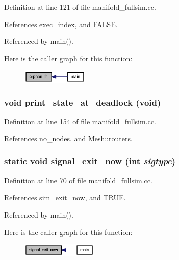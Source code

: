 Definition at line 121 of file manifold\_\-fullsim.cc.

References exec\_\-index, and FALSE.

Referenced by main().

Here is the caller graph for this function:\nopagebreak
\begin{figure}[H]
\begin{center}
\leavevmode
\includegraphics[width=89pt]{manifold__fullsim_8cc_83995bc1d7a29f4a3f671918e86f8eaa_icgraph}
\end{center}
\end{figure}
\subsubsection[{print\_\-state\_\-at\_\-deadlock}]{\setlength{\rightskip}{0pt plus 5cm}void print\_\-state\_\-at\_\-deadlock (void)}\label{manifold__fullsim_8cc_dd8eeaa0833d2f96796f0ee0f0e98f5c}




Definition at line 154 of file manifold\_\-fullsim.cc.

References no\_\-nodes, and Mesh::routers.
\subsubsection[{signal\_\-exit\_\-now}]{\setlength{\rightskip}{0pt plus 5cm}static void signal\_\-exit\_\-now (int {\em sigtype})\hspace{0.3cm}{\tt  [static]}}\label{manifold__fullsim_8cc_eb90a8280771250c1a9ee1d7518cbf63}




Definition at line 70 of file manifold\_\-fullsim.cc.

References sim\_\-exit\_\-now, and TRUE.

Referenced by main().

Here is the caller graph for this function:\nopagebreak
\begin{figure}[H]
\begin{center}
\leavevmode
\includegraphics[width=102pt]{manifold__fullsim_8cc_eb90a8280771250c1a9ee1d7518cbf63_icgraph}
\end{center}
\end{figure}
